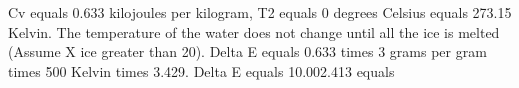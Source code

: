 Cv equals 0.633 kilojoules per kilogram, T2 equals 0 degrees Celsius equals 273.15 Kelvin.  
The temperature of the water does not change until all the ice is melted (Assume X ice greater than 20).  
Delta E equals 0.633 times 3 grams per gram times 500 Kelvin times 3.429.  
Delta E equals 10.002.413 equals